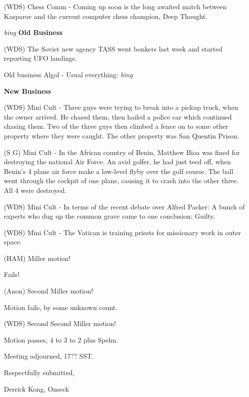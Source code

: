 (WDS) Chess Comm - Coming up soon is the long awaited match between
Kasparov and the current computer chess champion, Deep Thought.

\vspace{0.15in}
{\em bing\/}  {\bf Old Business}

(WDS) The Soviet new agency TASS went bonkers last week and started
reporting UFO landings.

Old business Algol - Usual everything: {\em bing\/}

\vspace{0.15in}
{\bf New Business}

(WDS) Mini Cult -  Three guys were trying to break into a pickup truck,
when the owner arrived.  He chased them, then hailed a police car
which continued chasing them.  Two of the three guys then climbed a
fence on to some other property where they were caught.  The other
property was San Quentin Prison.

(S G) Mini Cult - In the African country of Benin, Matthew Bioa was fined
for destroying the national Air Force.  An avid golfer, he had just
teed off, when Benin's 4 plane air force make a low-level flyby over
the golf course.  The ball went through the cockpit of one plane,
causing it to crash into the other three.  All 4 were destroyed.

(WDS) Mini Cult - In terms of the recent debate over Alfred Packer: A
bunch of experts who dug up the common grave came to one conclusion:
Guilty. 

(WDS) Mini Cult - The Vatican is training priests for missionary work
in outer space.

(HAM) Miller motion!

Fails!

(Anon) Second Miller motion!

Motion fails, by some unknown count.

(WDS) Second Second Miller motion!

Motion passes, 4 to 3 to 2 plus Spehn.

Meeting adjourned, 17?? SST.   

\vspace{0.15in}
\begin{center}
Respectfully submitted,

Derrick Kong, Onseck
\end{center}

